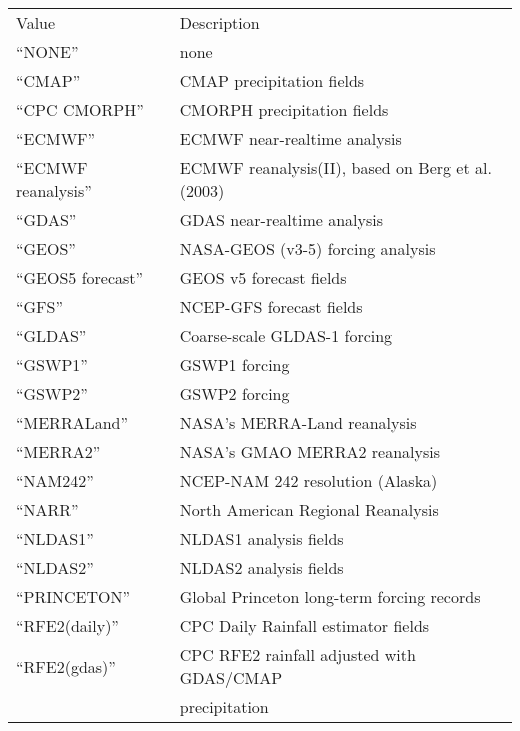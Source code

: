  \begin{tabular}{ll}
 Value                 & Description                                \\
 ``NONE''              & none                                       \\
 ``CMAP''              & CMAP precipitation fields                  \\
 ``CPC CMORPH''        & CMORPH precipitation fields                \\
 ``ECMWF''             & ECMWF near-realtime analysis               \\
 ``ECMWF reanalysis''  & ECMWF reanalysis(II),
                         based on Berg et al.(2003)                 \\
 ``GDAS''              & GDAS near-realtime analysis                \\
 ``GEOS''              & NASA-GEOS (v3-5) forcing analysis          \\
 ``GEOS5 forecast''    & GEOS v5 forecast fields                    \\
 ``GFS''               & NCEP-GFS forecast fields                   \\
 ``GLDAS''             & Coarse-scale GLDAS-1 forcing               \\
 ``GSWP1''             & GSWP1 forcing                              \\
 ``GSWP2''             & GSWP2 forcing                              \\
 ``MERRA\-Land''       & NASA's MERRA-Land reanalysis               \\
 ``MERRA2''            & NASA's GMAO MERRA2 reanalysis              \\
 ``NAM242''            & NCEP-NAM 242 resolution (Alaska)           \\
 ``NARR''              & North American Regional Reanalysis         \\
 ``NLDAS1''            & NLDAS1 analysis fields                     \\
 ``NLDAS2''            & NLDAS2 analysis fields                     \\
 ``PRINCETON''         & Global Princeton long-term forcing records \\
 ``RFE2(daily)''       & CPC Daily Rainfall estimator fields        \\
 ``RFE2(gdas)''        & CPC RFE2 rainfall adjusted with GDAS/CMAP  \\
                       & precipitation                              \\

\end{tabular}
